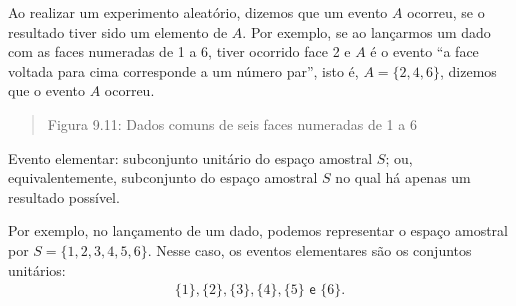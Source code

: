 Ao realizar um experimento aleatório, dizemos que um evento \(A\) ocorreu, se o resultado tiver sido um elemento de \(A\). Por exemplo, se ao lançarmos um dado com as faces numeradas de 1 a 6, tiver ocorrido face 2 e \(A\) é o evento “a face voltada para cima corresponde a um número par”, isto é, \(A=\{2,4,6\}\), dizemos que o evento \(A\) ocorreu.
\begin{quote}

\begin{figure}[H]
\centering

\noindent{}
\end{figure}

Figura 9.11: Dados comuns de seis faces numeradas de 1 a 6
\end{quote}
\begin{description}
\item[{Evento elementar: subconjunto unitário do espaço amostral \(S\); ou, equivalentemente, subconjunto do espaço amostral \(S\) no qual há apenas um resultado possível.}] \leavevmode{}\label{\detokenize{PE511-1:term-evento-elementar-subconjunto-unitario-do-espaco-amostral-ou-equivalentemente-subconjunto-do-espaco-amostral-no-qual-ha-apenas-um-resultado-possivel}}
\end{description}

Por exemplo, no lançamento de um dado, podemos representar o espaço amostral por \(S=\{1,2,3,4,5,6\}\). Nesse caso, os eventos elementares são os conjuntos unitários:
\begin{equation*}
\begin{split}\{1\}, \{2\}, \{3\}, \{4\}, \{5\} \textsf{ e } \{6\}.\end{split}
\end{equation*}

